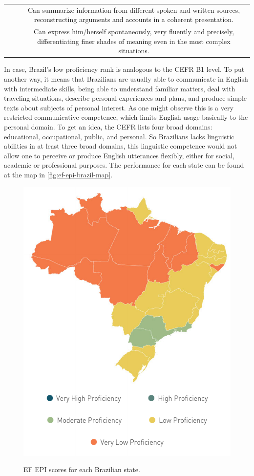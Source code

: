 \begin{table}[!htpb]
\begin{center}
\begin{tabular}{ABC}
 &  & Can summarize information from different spoken and written sources, reconstructing arguments and accounts in a coherent presentation. \\ 
 &  & Can express him/herself spontaneously, very fluently and precisely, differentiating finer shades of meaning even in the most complex situations. \\ \hline
\end{tabular}
\end{center}
\label{tab:cefr-levels}
\end{table}

In case, Brazil's low proficiency rank is analogous to the \ac{CEFR} B1 level. To put another way, it means that Brazilians are usually able to communicate in English with intermediate skills, being able to understand familiar matters, deal with traveling situations, describe personal experiences and plans, and produce simple texts about subjects of personal interest. As one might observe this is a very restricted communicative competence, which limits English usage basically to the personal domain. To get an idea, the \ac{CEFR} lists four broad domains: educational, occupational, public, and personal. So Brazilians lacks linguistic abilities in at least three broad domains, this linguistic competence would not allow one to perceive or produce English utterances flexibly, either for social, academic or professional purposes. The performance for each state can be found at the map in \autoref{fig:ef-epi-brazil-map}.

\begin{figure}[!ht]
        {\includegraphics[width=.8\linewidth]{gfx/ef-epi-brazil-map.pdf}}
        \caption{EF EPI scores for each Brazilian state.}
        \label{fig:ef-epi-brazil-map}
\end{figure}

